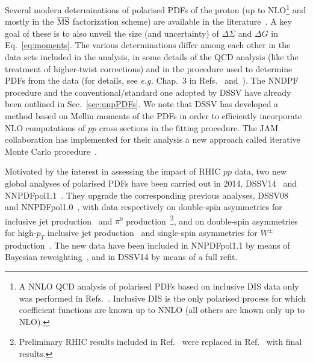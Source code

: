 Several modern determinations of polarised PDFs of the proton (up to 
NLO\footnote{A NNLO QCD analysis of polarised PDFs based on inclusive DIS
data only was performed in Refs.~\cite{Shahri:2016uzl,Khanpour:2017cha}.
Inclusive DIS is the only polarised process for which coefficient functions
are known up to NNLO (all others are known only up to NLO).} 
and mostly in the $\overline{\rm MS}$ factorization scheme) are available in 
the literature~\cite{Nocera:2014gqa,Nocera:2016xhb,deFlorian:2014yva,deFlorian:2008mr,deFlorian:2009vb,Sato:2016tuz,Leader:2010rb,Blumlein:2010rn,Bourrely:2014uha,Hirai:2008aj}. 
%
A key goal of these is to also unveil the size (and uncertainty) of
$\Delta\Sigma$ and  $\Delta G$ in Eq.~\eqref{eq:moments}. 
%
The various determinations differ among each other in the data sets included 
in the analysis, in some details of the QCD analysis (like the treatment of 
higher-twist corrections) and in the procedure used to determine PDFs from the 
data (for details, see {\it e.g.} Chap.~3 in Refs.~\cite{Nocera:2014vla} 
and~\cite{Nocera:2016xhb}). 
%
The NNDPF procedure and the conventional/standard one adopted by DSSV have 
already been outlined in Sec.~\ref{sec:unpPDFs}. 
%
We note that DSSV has developed a method based on Mellin moments of the PDFs 
in order to efficiently incorporate NLO computations
of $pp$ cross sections in the fitting procedure. 
%
The JAM collaboration has implemented for their analysis a new approach called 
iterative Monte Carlo procedure~\cite{Sato:2016tuz}. 

Motivated by the interest in assessing the impact of RHIC $pp$ 
data, two new global analyses of polarised PDFs have been carried out in
2014, DSSV14~\cite{deFlorian:2014yva} and NNPDFpol1.1~\cite{Nocera:2014gqa}.
%
They upgrade the corresponding previous analyses, 
DSSV08~\cite{deFlorian:2008mr,deFlorian:2009vb} and 
NNPDFpol1.0~\cite{Ball:2013lla}, with data respectively on double-spin 
asymmetries for inclusive jet production~\cite{Adamczyk:2014ozi} 
and $\pi^0$ production~\cite{Adare:2014hsq}\footnote{Preliminary RHIC results 
included in Ref.~\cite{deFlorian:2008mr} were replaced in
Ref.~\cite{deFlorian:2014yva} with final results.}, 
and on double-spin asymmetries for high-$p_T$ inclusive jet 
production~\cite{Adamczyk:2014ozi,Adamczyk:2012qj,Adare:2010cc} and single-spin
asymmetries for $W^\pm$ production~\cite{Adamczyk:2014xyw}.
%
The new data have been included in NNPDFpol1.1 
by means of Bayesian reweighting~\cite{Ball:2010gb},
and in DSSV14 by means of a full refit.  

